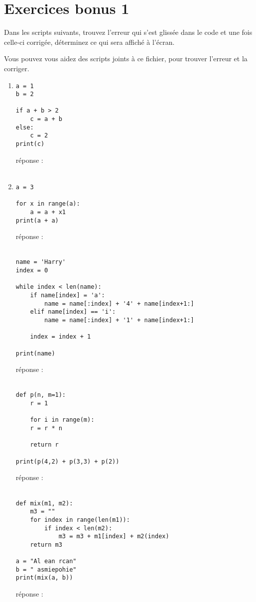 \documentclass[12pt,a4paper]{article}
\newcommand{\response}{réponse : \hrulefill\\\\}
\begin{document}
\section*{Exercices bonus 1}

Dans les scripts suivants, trouvez l'erreur qui s'est glissée dans le code et une fois celle-ci corrigée, déterminez ce qui sera affiché à l'écran.

Vous pouvez vous aidez des scripts joints à ce fichier, pour trouver l'erreur et la corriger. \\

\begin{enumerate}

\item
\begin{lstlisting}
a = 1
b = 2

if a + b > 2
	c = a + b
else:
	c = 2
print(c)
\end{lstlisting}
\response %

\item
\begin{lstlisting}
a = 3

for x in range(a):
	a = a + x1
print(a + a)   
\end{lstlisting}
\response %

\begin{lstlisting}
name = 'Harry'
index = 0

while index < len(name):
	if name[index] = 'a':
		name = name[:index] + '4' + name[index+1:]
	elif name[index] == 'i':
		name = name[:index] + '1' + name[index+1:]

	index = index + 1

print(name)
\end{lstlisting}
\response %

\begin{lstlisting}
def p(n, m=1):
	r = 1
	
	for i in range(m):
	r = r * n

	return r

print(p(4,2) + p(3,3) + p(2)) 
\end{lstlisting}
\response %

\begin{lstlisting}
def mix(m1, m2):
	m3 = ""
	for index in range(len(m1)):
		if index < len(m2):
			m3 = m3 + m1[index] + m2(index)
	return m3
	
a = "Al ean rcan"
b = " asmiepohie"
print(mix(a, b)) 	

\end{lstlisting}
\response %

\end{enumerate}
\end{document}
